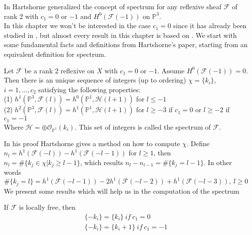 \documentclass[
	oldfontcommands,
	sumario=abnt-6027-2012,
	12pt,			%
	openright,		%
	oneside,		%
	a4paper,		%
	english,		%
	brazil			%
	]{imecc-unicamp}
\begin{document}
In \cite[Hartshorne, Theorem 7.1 p.151]{Hartshorne1980} Hartshorne generalized the concept of spectrum for any reflexive sheaf $\mathcal{F}$ of rank 2 with $c_1=0$ or $-1$ and $H^0(\mathcal{F}(-1))$ on $\mathbb{P}^3$.
\\In this chapter we won't be interested in the case $c_1=0$ since it has already been studied in \cite[Hartshorne \& Rao]{hartshorne1991}, but almost every result in this chapter is based on \cite[Hartshorne \& Rao]{hartshorne1991}. We start with some fundamental facts and definitions from Hartshorne's paper, starting from an equivalent definition for spectrum.
\begin{theorem}\cite[Hartshorne, Theorem 7.1]{Hartshorne1980}\label{alpinista1}
Let $\mathcal{F}$ be a rank 2 reflexive on $X$ with $c_1=0$ or $-1$. Assume $H^0(\mathcal{F}(-1))=0$. Then there is an unique sequence of integers (up to ordering) $\chi = \{k_i \}$, $i=1,...,c_2$ satisfying the following properties: \\
(1) $h^1(\mathbb{P}^3,\mathcal{F}(l))=h^0(\mathbb{P}^1,\mathcal{H}(l+1))$ for $l \leq -1$ \\
(2) $h^2(\mathbb{P}^3,\mathcal{F}(l))=h^1(\mathbb{P}^1,\mathcal{H}(l+1))$ for $l \geq -3$ if $c_1=0$ or $l \geq -2$ if $c_1=-1$ \\
Where $\mathcal{H}= \oplus \mathcal{O}_{\mathbb{P}^1}(k_i)$.
This set of integers is called the spectrum of $\mathcal{F}$.
\end{theorem}
In his proof Hartshorne gives a method on how to compute $\chi$.
Define  $n_l=h^1(\mathcal{F}(-l)) - h^1(\mathcal{F}(-l-1))$ for $l \geq 1$, then $n_l= \# \{ k_j \in \chi | k_j \geq l-1 \}$,
which results $n_l - n_{l-1}= \# \{k_j = l-1   \}$. In other words
\begin{equation}\label{spectrum}
\# \{k_j = l \}= h^1(\mathcal{F}(-l-1))-2h^1(\mathcal{F}(-l-2))+h^1(\mathcal{F}(-l-3)), \ l \geq 0
\end{equation}
We present some results which will help us in the computation of the spectrum
\begin{proposition}\cite[Hartshorne, Proposition 7.2]{Hartshorne1980}\label{alpinista2}
If $\mathcal{F}$ is locally free, then
\begin{align}
\{-k_i \}= \{k_i \} \ if \ c_1=0 \\
\{-k_i \} = \{k_i +1 \} \ if \ c_1=-1
\end{align}
\end{proposition}
\end{document}

